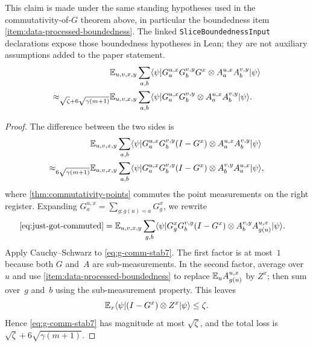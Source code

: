 \begin{lemma}\label{clm:g-comm-stability2}
	\leanok
	This claim is made under the same standing hypotheses used in the
	commutativity-of-$G$ theorem above, in particular the boundedness item
	\ref{item:data-processed-boundedness}.  The linked
	\texttt{SliceBoundednessInput} declarations expose those boundedness
	hypotheses in Lean; they are not auxiliary assumptions added to the paper
	statement.
	\begin{align*}
		                                           & \mathbb{E}_{u,v,x,y} \sum_{a,b}
		\langle \psi \rvert G_a^{u,x} G_b^{v,y} G^x \otimes A_a^{u,x} A_b^{v,y} \lvert \psi \rangle \\
		\approx_{\sqrt{\zeta}+6\sqrt{\gamma(m+1)}} &
		\mathbb{E}_{u,v,x,y} \sum_{a,b}
		\langle \psi \rvert G_a^{u,x} G_b^{v,y} \otimes A_a^{u,x} A_b^{v,y} \lvert \psi \rangle.
	\end{align*}
\end{lemma}
\begin{proof}
	\leanok
	The difference between the two sides is
	\begin{align}
		                              & \mathbb{E}_{u,v,x,y} \sum_{a,b}
		\langle \psi \rvert G_a^{u,x} G_b^{v,y} (I-G^x) \otimes A_a^{u,x} A_b^{v,y} \lvert \psi \rangle\nonumber \\
		\approx_{6\sqrt{\gamma(m+1)}} &
		\mathbb{E}_{u,v,x,y} \sum_{a,b}
		\langle \psi \rvert G_a^{u,x} G_b^{v,y} (I-G^x) \otimes A_b^{v,y} A_a^{u,x} \lvert \psi \rangle,
		\label{eq:just-got-commuted}
	\end{align}
	where \ref{thm:commutativity-points} commutes the point measurements on the right register. Expanding $G_a^{u,x}=\sum_{g:g(u)=a} G_g^x$, we rewrite
	\begin{align}
		\eqref{eq:just-got-commuted}
		 & = \mathbb{E}_{u,v,x,y} \sum_{g,b}
		\langle \psi \rvert G_g^x G_b^{v,y} (I-G^x) \otimes A_b^{v,y} A_{g(u)}^{u,x} \lvert \psi \rangle.
		\label{eq:g-comm-stab7}
	\end{align}
	Apply Cauchy--Schwarz to \ref{eq:g-comm-stab7}. The first factor is at most~$1$ because both $G$ and~$A$ are sub-measurements. In the second factor, average over~$u$ and use \ref{item:data-processed-boundedness} to replace $\mathbb{E}_u A_{g(u)}^{u,x}$ by $Z^x$; then sum over~$g$ and~$b$ using the sub-measurement property. This leaves
	\[
		\mathbb{E}_x \langle \psi \rvert (I-G^x) \otimes Z^x \lvert \psi \rangle \le \zeta.
	\]
	Hence \ref{eq:g-comm-stab7} has magnitude at most $\sqrt{\zeta}$, and the total loss is $\sqrt{\zeta}+6\sqrt{\gamma(m+1)}$.
\end{proof}

